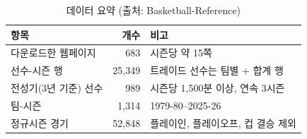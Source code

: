 \begin{table}[t]
\centering
\caption{데이터 요약 (출처: Basketball-Reference)}
\label{tab:data}
\footnotesize
\setlength{\tabcolsep}{4pt}
\begin{tabular}{@{}lrl@{}}
\toprule
항목 & 개수 & 비고 \\
\midrule
다운로드한 웹페이지 & 683 & 시즌당 약 15쪽 \\
선수-시즌 행 & 25{,}349 & 트레이드 선수는 팀별 + 합계 행 \\
전성기(3년 기준) 선수 & 989 & 시즌당 1{,}500분 이상, 연속 3시즌 \\
팀-시즌 & 1{,}314 & 1979-80--2025-26 \\
정규시즌 경기 & 52{,}848 & 플레이인, 플레이오프, 컵 결승 제외 \\
\bottomrule
\end{tabular}
\end{table}
